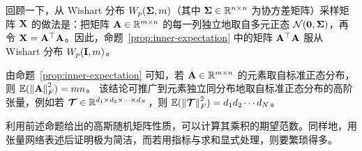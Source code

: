 回顾一下，从 Wishart 分布 $W_p(\mathbf{\Sigma}, m)$（其中 $\mathbf{\Sigma} \in \mathbb{R}^{n\times n}$ 为协方差矩阵）采样矩阵 $\mathbf{X}$ 的做法是：把矩阵 $\mathbf{A}\in\mathbb R^{m\times n}$ 的每一列独立地取自多元正态 $\mathcal N(\mathbf{0} , \mathbf{\Sigma})$，再令 $\mathbf{X} = \mathbf{A}^\top\mathbf{A}$。因此，命题~\ref{prop:inner-expectation} 中的矩阵 $\mathbf{A} ^\top \mathbf{A}$ 服从 Wishart 分布  $W_p(\mathbf{I},m)$。
\begin{remark} 由命题~\ref{prop:inner-expectation} 可知，若 $\mathbf{A} \in \mathbb{R}^{m \times n}$ 的元素取自标准正态分布，则 $\mathbb{E}(\left\lVert\mathbf{A}\right\rVert_F^2) = mn$。 
该结论可推广到元素独立同分布地取自标准正态分布的高阶张量，例如若 $\bm{\mathcal{T}}\in\mathbb{R}^{d_1\times d_2\times\cdots\times d_N}$，则 $\mathbb{E}(\left\lVert\bm{\mathcal{T}}\right\rVert_F^2) = d_1d_2\cdots d_N$。
\end{remark}
利用前述命题给出的高斯随机矩阵性质，可以计算其乘积的期望范数。同样地，用张量网络表述后证明极为简洁，而若用指标与求和显式处理，则要繁琐得多。
